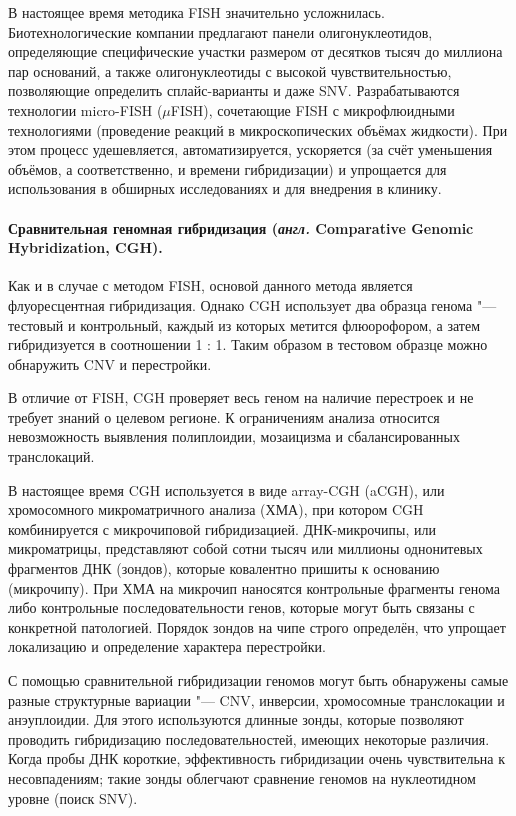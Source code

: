 \documentclass[a4paper,12pt]{article}
\begin{document}
В настоящее время методика FISH значительно усложнилась.
Биотехнологические компании предлагают панели олигонуклеотидов, определяющие специфические участки размером от десятков тысяч до миллиона пар оснований, а также олигонуклеотиды с высокой чувствительностью, позволяющие определить сплайс-варианты и даже SNV.
Разрабатываются технологии micro-FISH ($\mu$FISH), сочетающие FISH с микрофлюидными технологиями (проведение реакций в микроскопических объёмах жидкости).
При этом процесс удешевляется, автоматизируется, ускоряется (за счёт уменьшения объёмов, а соответственно, и времени гибридизации) и упрощается для использования в обширных исследованиях и для внедрения в клинику\cite{Huber_2018}.

\paragraph{Сравнительная геномная гибридизация (\textit{англ.} Comparative Genomic Hybridization, CGH).}
Как и в случае с методом FISH, основой данного метода является флуоресцентная гибридизация.
Однако CGH использует два образца генома "--- тестовый и контрольный, каждый из которых метится флюорофором, а затем гибридизуется в соотношении 1 : 1.
Таким образом в тестовом образце можно обнаружить CNV и перестройки.

В отличие от FISH, CGH проверяет весь геном на наличие перестроек и не требует знаний о целевом регионе.
К ограничениям анализа относится невозможность выявления полиплоидии, мозаицизма и сбалансированных транслокаций.

В настоящее время CGH используется в виде array-CGH (aCGH), или хромосомного микроматричного анализа (ХМА), при котором CGH комбинируется с микрочиповой гибридизацией\cite{Theisen_2008}.
ДНК-микрочипы, или микроматрицы, представляют собой сотни тысяч или миллионы однонитевых фрагментов ДНК (зондов), которые ковалентно пришиты к основанию (микрочипу).
При ХМА на микрочип наносятся контрольные фрагменты генома либо контрольные последовательности генов, которые могут быть связаны с конкретной патологией.
Порядок зондов на чипе строго определён, что упрощает локализацию и определение характера перестройки.
    
С помощью сравнительной гибридизации геномов могут быть обнаружены самые разные структурные вариации "--- CNV, инверсии, хромосомные транслокации и анэуплоидии.
Для этого используются длинные зонды, которые позволяют проводить гибридизацию последовательностей, имеющих некоторые различия.
Когда пробы ДНК короткие, эффективность гибридизации очень чувствительна к несовпадениям; такие зонды облегчают сравнение геномов на нуклеотидном уровне (поиск SNV).
\end{document}
